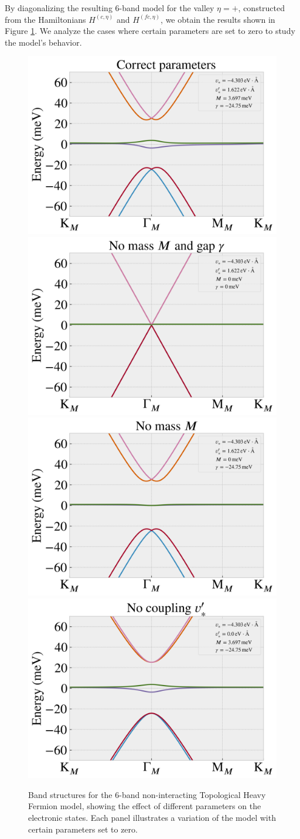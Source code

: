 \documentclass[12pt]{report}
\begin{document}
By diagonalizing the resulting 6-band model for the valley $\eta = +$, constructed from the Hamiltonians $H^{(c,\eta)}$ and $H^{(fc,\eta)}$, we obtain the results shown in Figure \ref{fig:thf-exploration}. We analyze the cases where certain parameters are set to zero to study the model's behavior.

\begin{figure}[H]
\centering
\includegraphics[height=0.35\linewidth]{fig/thf-correct_params.png}
\includegraphics[height=0.35\linewidth]{fig/thf-no_M_no_gamma.png}
\includegraphics[height=0.35\linewidth]{fig/thf-no_M.png}
\includegraphics[height=0.35\linewidth]{fig/thf-no_coupling.png}
\caption{Band structures for the 6-band non-interacting Topological Heavy Fermion model, showing the effect of different parameters on the electronic states. Each panel illustrates a variation of the model with certain parameters set to zero.}
\label{fig:thf-exploration}
\end{figure}
\end{document}
